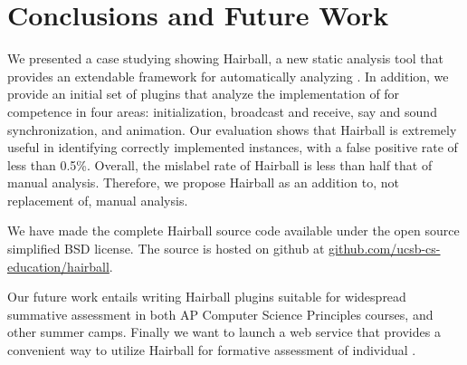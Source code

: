 \section{Conclusions and Future Work} 

We presented a case studying showing Hairball, a new static analysis tool that
provides an extendable framework for automatically analyzing .  In
addition, we provide an initial set of plugins that analyze the implementation
of  for competence in four areas: initialization, broadcast and
receive, say and sound synchronization, and animation.  Our evaluation shows
that Hairball is extremely useful in identifying correctly implemented
instances, with a false positive rate of less than 0.5\%.  Overall, the
mislabel rate of Hairball is less than half that of manual analysis.
Therefore, we propose Hairball as an addition to, not replacement of, manual
analysis.

We have made the complete Hairball source code available under the open source
simplified BSD license. The source is hosted on github at
\url{github.com/ucsb-cs-education/hairball}.

Our future work entails writing Hairball plugins suitable for wide\-spread
summative assessment in both AP Computer Science Principles courses, and other
summer camps. Finally we want to launch a web service that provides a
convenient way to utilize Hairball for formative assessment of individual
.

